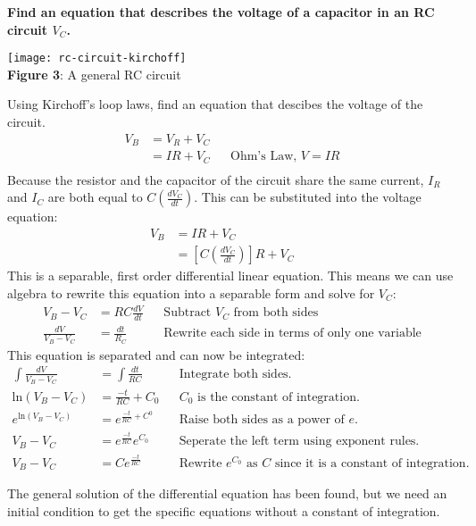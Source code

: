 \documentclass[12pt]{article}
\begin{document}
\textbf{Find an equation that describes the voltage of a capacitor in an RC circuit $V_C$.}

\begin{center} \texttt{[image: rc-circuit-kirchoff]} \\ \footnotesize \textbf{Figure 3}: A general RC circuit  \end{center}

Using Kirchoff's loop laws, find an equation that descibes the voltage of the circuit.
\begin{align*}
  V_B  	&= V_R + V_C  	&& {} \\ 
    	&= IR + V_C 	&& \text{Ohm's Law, $V = IR$} \\
\end{align*}
Because the resistor and the capacitor of the circuit share the same current, 
$I_R$ and $I_C$ are both equal to $C(\frac{dV_C}{dt})$. This can be substituted into the voltage equation:
\begin{align*}
  V_B  	&= IR + V_C && {} \\
    	&= \left[C(\frac{dV_C}{dt})\right]R + V_C && {}
\end{align*}
This is a separable, first order differential linear equation.
This means we can use algebra to rewrite this equation into a separable form and solve for $V_C$:
\begin{align*}
  V_B - V_C  	&= R C\frac{dV}{dt} && \text{Subtract $V_C$ from both sides} \\ 
  \frac{dV}{V_B - V_C}  	&= \frac{dt}{R_C} && \text{Rewrite each side in terms of only one variable}
\end{align*}
This equation is separated and can now be integrated:
\begin{align*}
\int\frac{dV}{V_B - V_C} &= \int{\frac{dt}{RC}} && \text{Integrate both sides.} \\
\text{ln}(V_B - V_C) &= \frac{-t}{RC} + C_0 && \text{$C_0$ is the constant of integration.} \\
e^{\text{ln}(V_B - V_C)} &= e^{\frac{-t}{RC} + C^0} && \text{Raise both sides as a power of $e$.} \\
{V_B - V_C} &= e^{\frac{-t}{RC}}e^{C_0} && \text{Seperate the left term using exponent rules.} \\
{V_B - V_C} &= C e^{\frac{-t}{RC}} && \text{Rewrite $e^{C_0}$ as $C$ since it is a constant of integration.} 
\end{align*}

The general solution of the differential equation has been found, but we need an initial condition to get the specific equations without a constant of integration.
\end{document}
